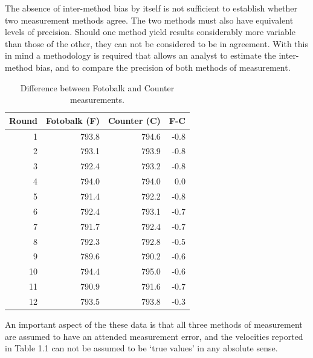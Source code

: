 \documentclass[12pt, a4paper]{report}
\theoremstyle{plain}
\theoremstyle{definition}
\theoremstyle{remark}
\begin{document}
	The absence of inter-method bias by itself is not sufficient to
	establish whether two measurement methods agree. The two methods
	must also have equivalent levels of precision. Should one method
	yield results considerably more variable than those of the other,
	they can not be considered to be in agreement. With this in mind a
	methodology is required that allows an analyst to estimate the
	inter-method bias, and to compare the precision of both methods of
	measurement.
	\newpage
	\begin{table}[h!]
		
		\begin{center}
			
			\begin{tabular}{rrrr}
				\hline
				Round& Fotobalk (F) & Counter (C) & F-C \\
				\hline
				1 & 793.8& 794.6 & -0.8 \\
				2 & 793.1 & 793.9 & -0.8 \\
				3 & 792.4 & 793.2 & -0.8 \\
				4 & 794.0 & 794.0 & 0.0 \\
				5 & 791.4 & 792.2 & -0.8 \\
				6 & 792.4 & 793.1 & -0.7 \\
				7 & 791.7 & 792.4 & -0.7 \\
				8 & 792.3 & 792.8 & -0.5 \\
				9 & 789.6 & 790.2 & -0.6 \\
				10 & 794.4 & 795.0 & -0.6 \\
				11 & 790.9 & 791.6 & -0.7 \\
				12 & 793.5 & 793.8 & -0.3 \\
				\hline
			\end{tabular}
			\caption{Difference between Fotobalk and Counter measurements.}
		\end{center}
	\end{table}
	

	
	\newpage

	
	An important aspect of the these data is that all three methods of
	measurement are assumed to have an attended measurement error, and
	the velocities reported in Table 1.1 can not be assumed to be
	`true values' in any absolute sense.
	
\end{document}
